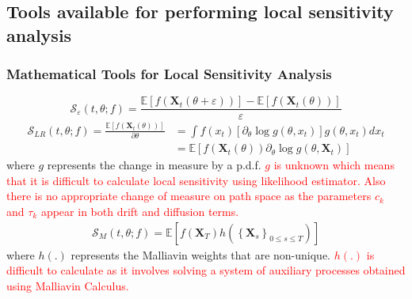 \documentclass[a4paper,10pt]{beamer}
\newcommand{\BS}[1]{\boldsymbol{#1}}
\newcommand{\E}[1]{\mathbb{E}\left[ #1 \right]}
\newcommand{\sqb}[1]{\left[ #1 \right]}
\newcommand{\rb}[1]{\left( #1 \right)}
\newcommand{\cb}[1]{\left \{ #1 \right \}}
\begin{document}
	\begin{frame}
		\subsection{Tools available for performing local sensitivity analysis}
		\frametitle{Mathematical Tools for Local Sensitivity Analysis}
			\footnotesize
			$$ \mathcal{S}_{\varepsilon}\rb{t,\theta;f} = \frac{\E{f\rb{\BS{X}_{t}\rb{\theta + \varepsilon}}} - \E{f\rb{\BS{X}_{t}\rb{\theta}}}}{\varepsilon} $$
			\begin{align*}
				\mathcal{S}_{LR}\rb{t,\theta;f} = \frac{\E{f\rb{\BS{X}_{t}\rb{\theta}}}}{\partial \theta} &= \int f\rb{x_{t}} \sqb{\partial_{\theta} \log g\rb{\theta,x_{t}}} g\rb{\theta,x_{t}} dx_{t} \\
				\, &= \E{f\rb{\BS{X}_{t}\rb{\theta}} \partial_{\theta} \log g \rb{\theta,\BS{X}_{t}}}
			\end{align*}
			where $g$ represents the change in measure by a p.d.f. \textcolor{red}{$g$ is unknown which means that it is difficult to calculate local sensitivity using likelihood estimator. Also there is no appropriate change of measure on path space as the parameters $c_{k}$ and $\tau_{k}$ appear in both drift and diffusion terms.} \\
			\vspace{0.2cm}
			\begin{align*}
				\mathcal{S}_{M}\rb{t,\theta;f} = \E{f\rb{\BS{X}_{T}}h\rb{\cb{\BS{X}_{s}}_{0 \leq s \leq T}}}
			\end{align*}
			where $h\rb{.}$ represents the Malliavin weights that are non-unique. \textcolor{red}{$h(.)$ is difficult to calculate as it involves solving a system of auxiliary processes obtained using Malliavin Calculus.} 
	\end{frame}
\end{document}
